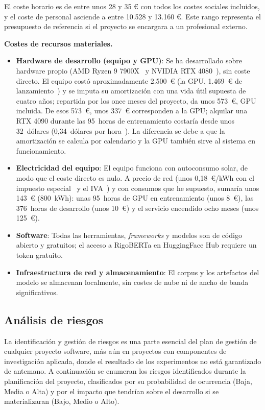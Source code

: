 El coste horario es de entre unos 28 y 35 € con todos los costes sociales incluidos, y el coste de personal asciende a entre 10.528 y 13.160 €. Este rango representa el presupuesto de referencia si el proyecto se encargara a un profesional externo.

\textbf{Costes de recursos materiales.}
\begin{itemize}
 \item \textbf{Hardware de desarrollo (equipo y GPU)}: Se ha desarrollado sobre hardware propio (AMD Ryzen 9 7900X~\cite{amdryzen7900x} y NVIDIA RTX 4080~\cite{nvidiartx4080}), sin coste directo. El equipo costó aproximadamente 2.500~€ (la GPU, 1.469~€ de lanzamiento~\cite{nvidiartx40anuncio2022}) y se imputa su amortización con una vida útil supuesta de cuatro años; repartida por los once meses del proyecto, da unos 573~€, GPU incluida. De esos 573~€, unos 337~€ corresponden a la GPU; alquilar una RTX 4090 durante las 95~horas de entrenamiento costaría desde unos 32~dólares (0,34~dólares por hora~\cite{runpodprecios2026}). La diferencia se debe a que la amortización se calcula por calendario y la GPU también sirve al sistema en funcionamiento.
 \item \textbf{Electricidad del equipo}: El equipo funciona con autoconsumo solar, de modo que el coste directo es nulo. A precio de red (unos 0,18~€/kWh con el impuesto especial~\cite{ley38impuestosespeciales1992} y el IVA~\cite{ley37iva1992}) y con consumos que he supuesto, sumaría unos 143~€ (800~kWh): unas 95~horas de GPU en entrenamiento (unos 8~€), las 376~horas de desarrollo (unos 10~€) y el servicio encendido ocho meses (unos 125~€).
 \item \textbf{Software}: Todas las herramientas, \emph{frameworks} y modelos son de código abierto y gratuitos; el acceso a RigoBERTa en HuggingFace Hub requiere un token gratuito.
 \item \textbf{Infraestructura de red y almacenamiento}: El corpus y los artefactos del modelo se almacenan localmente, sin costes de nube ni de ancho de banda significativos.
\end{itemize}

\subsection{Análisis de riesgos}

La identificación y gestión de riesgos es una parte esencial del plan de gestión de cualquier proyecto software, más aún en proyectos con componentes de investigación aplicada, donde el resultado de los experimentos no está garantizado de antemano. A continuación se enumeran los riesgos identificados durante la planificación del proyecto, clasificados por su probabilidad de ocurrencia (Baja, Media o Alta) y por el impacto que tendrían sobre el desarrollo si se materializaran (Bajo, Medio o Alto).

